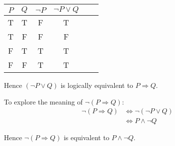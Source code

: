 \documentclass[11pt, a4paper, oneside]{exam}
\theoremstyle{definition}\newtheorem{define}{Definition}[section]
\theoremstyle{remark}\newtheorem{remark}{Remark}
\theoremstyle{definition}\newtheorem{example}{Example}[subsection]
\theoremstyle{definition}\newtheorem{notation}{Notation}[section]
\theoremstyle{definition}\newtheorem{theorem}{Theorem}[section]
\theoremstyle{definition}\newtheorem{corollary}{Corollary}[section]
\begin{document}
\begin{center}
\begin{tabular}{|c|c|c|c|c|c|} \hline
	$P$ & $Q$ & $\neg P$ & $\neg P \lor Q$\\ \hline
	T & T & F & T\\
	T & F & F & F\\
	F & T & T & T\\
	F & F & T & T\\ \hline
\end{tabular}
\end{center}

Hence $(\neg P \lor Q)$ is logically equivalent to $P \Rightarrow Q$.

To explore the meaning of $\neg ( P \Rightarrow Q)$:
\begin{align*}
	\neg ( P \Rightarrow Q) &\Leftrightarrow \neg( \neg P \lor Q )\\
	&\Leftrightarrow P \land \neg Q
\end{align*}

Hence $\neg( P \Rightarrow Q )$ is equivalent to $P \land \neg Q$.




\end{document}
